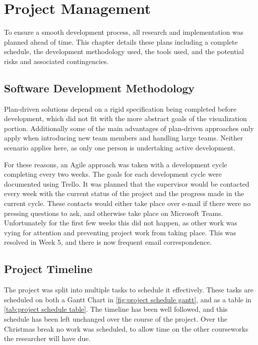 
\chapter{Project Management}
\label{sec:ProjectManagement}

To ensure a smooth development process, all research and implementation was planned ahead of time.
This chapter details these plans including a complete schedule, the development methodology used, the tools used, and the potential risks and associated contingencies.

\section{Software Development Methodology}
Plan-driven solutions depend on a rigid specification being completed before development\cite{modules:CS261}, which did not fit with the more abstract goals of the visualization portion.
Additionally some of the main advantages of plan-driven approaches only apply when introducing new team members and handling large teams.
Neither scenario applies here, as only one person is undertaking active development.

For these reasons, an Agile approach was taken with a development cycle completing every two weeks.
The goals for each development cycle were documented using Trello\cite{tool:Trello}.
It was planned that the supervisor would be contacted every week with the current status of the project and the progress made in the current cycle.
These contacts would either take place over e-mail if there were no pressing questions to ask, and otherwise take place on Microsoft Teams\cite{tool:MicrosoftTeams}.
Unfortunately for the first few weeks this did not happen, as other work was vying for attention and preventing project work from taking place.
This was resolved in Week 5, and there is now frequent email correspondence.

\section{Project Timeline}
The project was split into multiple tasks to schedule it effectively.
These tasks are scheduled on both a Gantt Chart in \cref{fig:project schedule gantt}, and as a table in \cref{tab:project schedule table}.
The timeline has been well followed, and this schedule has been left unchanged over the course of the project. 
Over the Christmas break no work was scheduled, to allow time on the other courseworks the researcher will have due.

